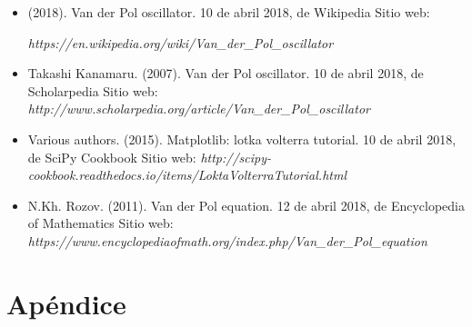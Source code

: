 \documentclass[a4paper]{article}
\begin{document}
\begin{itemize}
\item (2018). Van der Pol oscillator. 10 de abril 2018, de Wikipedia Sitio web:

\textit{https://en.wikipedia.org/wiki/Van\_der\_Pol\_oscillator}


\item Takashi Kanamaru. (2007). Van der Pol oscillator. 10 de abril 2018, de Scholarpedia Sitio web:
\textit{http://www.scholarpedia.org/article/Van\_der\_Pol\_oscillator}


\item Various authors. (2015). Matplotlib: lotka volterra tutorial. 10 de abril 2018, de SciPy Cookbook Sitio web:
\textit{http://scipy-cookbook.readthedocs.io/items/LoktaVolterraTutorial.html}


\item N.Kh. Rozov. (2011). Van der Pol equation. 12 de abril 2018, de Encyclopedia of Mathematics Sitio web:
\textit{https://www.encyclopediaofmath.org/index.php/Van\_der\_Pol\_equation}
\end{itemize}



\section{Apéndice}
\end{document}

